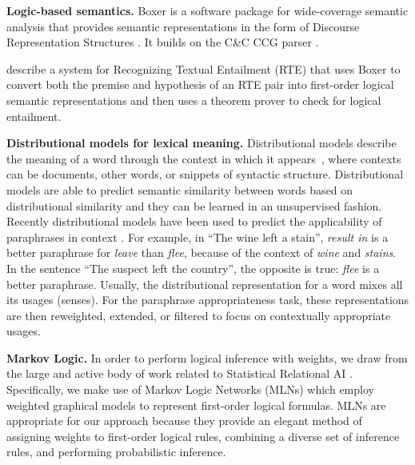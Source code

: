 \textbf{Logic-based semantics.}
Boxer \citep{bos:coling2004} is a software package for wide-coverage semantic
analysis that provides semantic representations in the form of Discourse
Representation Structures \citep{kamp:book93}. It builds on the C\&C CCG parser
\citep{clark:acl04}.

\citet{bos:emnlp2005} describe a system for Recognizing Textual Entailment
(RTE) that uses Boxer to convert both the premise and hypothesis of an RTE pair
into first-order logical semantic representations and then uses a theorem prover
to check for logical entailment. 


\noindent\textbf{Distributional models for lexical meaning.} Distributional
models describe the meaning of a word through the context in which it
appears~\citep{landauer97:solution,lund96:producing}, where contexts can be
documents, other words, or snippets of syntactic structure. Distributional
models are able to predict semantic similarity between words based on
distributional similarity and they can be learned in an unsupervised fashion.
Recently distributional models have been used to predict the applicability of
paraphrases in context \citep{erk:emnlp2008,thater:acl2010,reisinger:naacl2010,dinu:emnlp2010,vandecruys:emnlp2011}.
For example, in ``The wine left a stain'', {\it result in} is a better
paraphrase for {\it leave} than {\it flee}, because of the context of {\it wine}
and {\it stains}.  In the sentence ``The suspect left the country'', the
opposite is true: {\it flee} is a better paraphrase. Usually, the distributional
representation for a word mixes all its usages (senses). For the paraphrase
appropriateness task, these representations are then reweighted, extended, or
filtered to focus on contextually appropriate usages.

\noindent\textbf{Markov Logic.} 
In order to perform logical inference with weights, we draw
from the large and active body of work related to Statistical Relational AI
\citep{getoor:book2007}.  Specifically, we make use of Markov Logic Networks
(MLNs) \citep{richardson:mlj06} which employ weighted graphical models to
represent first-order logical formulas. MLNs are appropriate for our approach
because they provide an elegant method of assigning weights to first-order
logical rules, combining a diverse set of inference rules, and performing
probabilistic inference.

